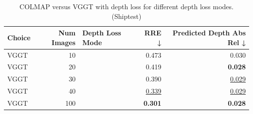 \begin{table}[H]
\caption{COLMAP versus VGGT with depth loss for different depth loss modes. (Shiptest)}
\label{tab:05_depth_loss_num_images_shiptest}
\begin{tabular}{lrlrr}
\toprule
Choice & Num Images & Depth Loss Mode & RRE ↓ & Predicted Depth Abs Rel ↓ \\
\midrule
VGGT & 10 &  & 0.473 & 0.030 \\
VGGT & 20 &  & 0.419 & \textbf{0.028} \\
VGGT & 30 &  & 0.390 & \underline{0.029} \\
VGGT & 40 &  & \underline{0.339} & \underline{0.029} \\
VGGT & 100 &  & \textbf{0.301} & \textbf{0.028} \\
\bottomrule
\end{tabular}
\end{table}
